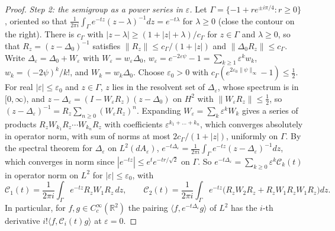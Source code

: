 \documentclass[pdflatex,sn-mathphys-num]{sn-jnl}
\theoremstyle{thmstyleone}%
\theoremstyle{thmstylethree}%
\newcommand{\R}{\mathbb{R}}
\begin{document}
\begin{appendices}
\begin{proof}
\emph{Step 2: the semigroup as a power series in $\varepsilon$.} Let $\Gamma=\{-1+re^{\pm i\pi/4}:r\ge0\}$, oriented so that $\frac1{2\pi i}\int_\Gamma e^{-tz}(z-\lambda)^{-1}dz=e^{-t\lambda}$ for $\lambda\ge0$ (close the contour on the right). There is $c_\Gamma$ with $|z-\lambda|\ge(1+|z|+\lambda)/c_\Gamma$ for $z\in\Gamma$ and $\lambda\ge0$, so that $R_z=(z-\Delta_0)^{-1}$ satisfies $\|R_z\|\le c_\Gamma/(1+|z|)$ and $\|\Delta_0R_z\|\le c_\Gamma$. Write $\Delta_\varepsilon=\Delta_0+W_\varepsilon$ with $W_\varepsilon=w_\varepsilon\Delta_0$, $w_\varepsilon=e^{-2\varepsilon\psi}-1=\sum_{k\ge1}\varepsilon^kw_k$, $w_k=(-2\psi)^k/k!$, and $W_k=w_k\Delta_0$. Choose $\varepsilon_0>0$ with $c_\Gamma(e^{2\varepsilon_0\|\psi\|_\infty}-1)\le\frac12$. For real $|\varepsilon|\le\varepsilon_0$ and $z\in\Gamma$, $z$ lies in the resolvent set of $\Delta_\varepsilon$, whose spectrum is in $[0,\infty)$, and $z-\Delta_\varepsilon=(I-W_\varepsilon R_z)(z-\Delta_0)$ on $H^2$ with $\|W_\varepsilon R_z\|\le\frac12$, so $(z-\Delta_\varepsilon)^{-1}=R_z\sum_{n\ge0}(W_\varepsilon R_z)^n$. Expanding $W_\varepsilon=\sum_k\varepsilon^kW_k$ gives a series of products $R_zW_{k_1}R_z\cdots W_{k_n}R_z$ with coefficients $\varepsilon^{k_1+\dots+k_n}$, which converges absolutely in operator norm, with sum of norms at most $2c_\Gamma/(1+|z|)$, uniformly on $\Gamma$. By the spectral theorem for $\Delta_\varepsilon$ on $L^2(dA_\varepsilon)$, $e^{-t\Delta_\varepsilon}=\frac1{2\pi i}\int_\Gamma e^{-tz}(z-\Delta_\varepsilon)^{-1}dz$, which converges in norm since $|e^{-tz}|\le e^te^{-tr/\sqrt2}$ on $\Gamma$. So $e^{-t\Delta_\varepsilon}=\sum_{k\ge0}\varepsilon^k\mathcal C_k(t)$ in operator norm on $L^2$ for $|\varepsilon|\le\varepsilon_0$, with
\[
\mathcal C_1(t)=\frac1{2\pi i}\int_\Gamma e^{-tz}R_zW_1R_z\,dz,\qquad \mathcal C_2(t)=\frac1{2\pi i}\int_\Gamma e^{-tz}\bigl(R_zW_2R_z+R_zW_1R_zW_1R_z\bigr)dz .
\]
In particular, for $f,g\in C_c^\infty(\R^2)$ the pairing $\langle f,e^{-t\Delta_\varepsilon}g\rangle$ of $L^2$ has the $i$-th derivative $i!\langle f,\mathcal C_i(t)g\rangle$ at $\varepsilon=0$.


\end{proof}
\end{appendices}
\end{document}
